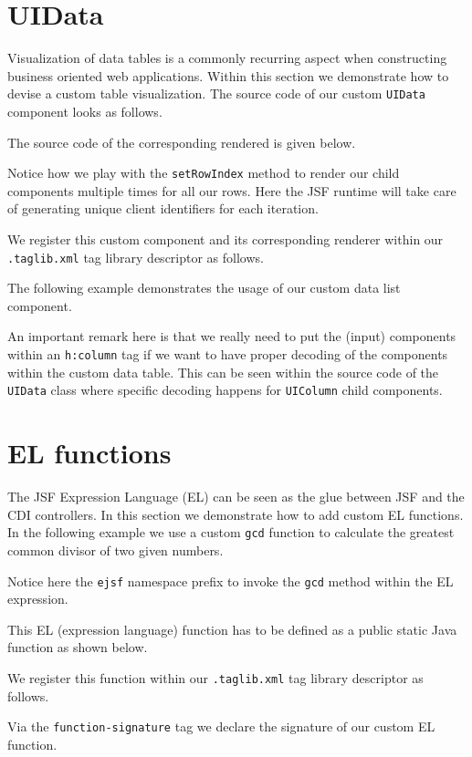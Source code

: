 \section{UIData}
Visualization of data tables is a commonly recurring aspect when constructing business oriented web applications.
Within this section we demonstrate how to devise a custom table visualization.
The source code of our custom \texttt{UIData} component looks as follows.


The source code of the corresponding rendered is given below.

Notice how we play with the \texttt{setRowIndex} method to render our child components multiple times for all our rows.
Here the JSF runtime will take care of generating unique client identifiers for each iteration.

We register this custom component and its corresponding renderer within our \texttt{.taglib\allowbreak .xml} tag library descriptor as follows.


The following example demonstrates the usage of our custom data list component.

An important remark here is that we really need to put the (input) components within an \texttt{h:column} tag if we want to have proper decoding of the components within the custom data table.
This can be seen within the source code of the \texttt{UIData} class where specific decoding happens for \texttt{UIColumn} child components.


\section{EL functions}
The JSF Expression Language (EL) can be seen as the glue between JSF and the CDI controllers.
In this section we demonstrate how to add custom EL functions.
In the following example we use a custom \texttt{gcd} function to calculate the greatest common divisor of two given numbers.

Notice here the \texttt{ejsf} namespace prefix to invoke the \texttt{gcd} method within the EL expression.

This EL (expression language) function has to be defined as a public static Java function as shown below.


We register this function within our \texttt{.taglib.xml} tag library descriptor as follows.

Via the \texttt{function-signature} tag we declare the signature of our custom EL function.
